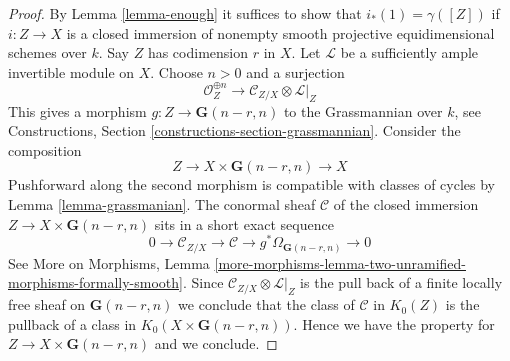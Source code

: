 \documentclass[10pt,a4paper]{amsart}
\theoremstyle{plain}
\theoremstyle{definition}
\theoremstyle{remark}
\numberwithin{equation}{subsection}
\begin{document}
\begin{proof}
By Lemma \ref{lemma-enough} it suffices to show that $i_*(1) = \gamma([Z])$
if $i : Z \to X$ is a closed immersion of nonempty
smooth projective equidimensional
schemes over $k$. Say $Z$ has codimension $r$ in $X$.
Let $\mathcal{L}$ be a sufficiently ample invertible module on $X$.
Choose $n > 0$ and a surjection
$$
\mathcal{O}_Z^{\oplus n} \to \mathcal{C}_{Z/X} \otimes \mathcal{L}|_Z
$$
This gives a morphism $g : Z \to \mathbf{G}(n - r, n)$
to the Grassmannian over $k$, see
Constructions, Section \ref{constructions-section-grassmannian}.
Consider the composition
$$
Z \to X \times \mathbf{G}(n - r, n) \to X
$$
Pushforward along the second morphism is compatible with classes
of cycles by Lemma \ref{lemma-grassmanian}. The conormal sheaf $\mathcal{C}$
of the closed immersion $Z \to X \times \mathbf{G}(n - r, n)$ sits in
a short exact sequence
$$
0 \to \mathcal{C}_{Z/X} \to \mathcal{C} \to
g^*\Omega_{\mathbf{G}(n - r, n)} \to 0
$$
See More on Morphisms, Lemma
\ref{more-morphisms-lemma-two-unramified-morphisms-formally-smooth}.
Since $\mathcal{C}_{Z/X} \otimes \mathcal{L}|_Z$ is the pull
back of a finite locally free sheaf on $\mathbf{G}(n - r, n)$
we conclude that the class of $\mathcal{C}$ in $K_0(Z)$
is the pullback of a class in $K_0(X \times \mathbf{G}(n - r, n))$.
Hence we have the property for $Z \to X \times \mathbf{G}(n - r, n)$
and we conclude.
\end{proof}
\end{document}
